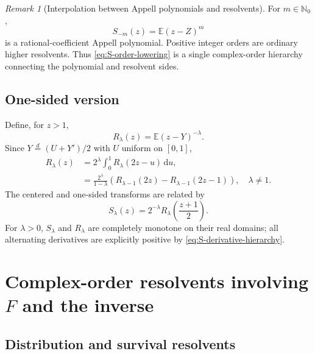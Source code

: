 \documentclass[11pt,oneside]{article}
\numberwithin{equation}{section}
\theoremstyle{plain}
\theoremstyle{definition}
\theoremstyle{remark}
\newtheorem{remark}[theorem]{Remark}
\newcommand{\N}{\mathbb N}
\newcommand{\E}{\mathbb E}
\newcommand{\dd}{\,\mathrm d}
\begin{document}
\begin{remark}[Interpolation between Appell polynomials and resolvents]
For $m\in\N_0$,
\begin{equation}
 S_{-m}(z)=\E(z-Z)^m
 \label{eq:S-negative-polynomial}
\end{equation}
is a rational-coefficient Appell polynomial.  Positive integer orders are
ordinary higher resolvents.  Thus \cref{eq:S-order-lowering} is a single
complex-order hierarchy connecting the polynomial and resolvent sides.
\end{remark}

\subsection{One-sided version}

Define, for $z>1$,
\begin{equation}
 R_\lambda(z)=\E(z-Y)^{-\lambda}.
 \label{eq:R-lambda}
\end{equation}
Since $Y\overset d=(U+Y')/2$ with $U$ uniform on $[0,1]$,
\begin{align}
 R_\lambda(z)
 &=2^\lambda\int_0^1R_\lambda(2z-u)\dd u,
 \label{eq:R-integral-refinement}\\
 &=\frac{2^\lambda}{1-\lambda}
   \left(R_{\lambda-1}(2z)-R_{\lambda-1}(2z-1)\right),
 \quad \lambda\ne1.
 \label{eq:R-order-lowering}
\end{align}
The centered and one-sided transforms are related by
\begin{equation}
 S_\lambda(z)=2^{-\lambda}
 R_\lambda\!\left(\frac{z+1}{2}\right).
 \label{eq:S-R-relation}
\end{equation}
For $\lambda>0$, $S_\lambda$ and $R_\lambda$ are completely monotone on their
real domains; all alternating derivatives are explicitly positive by
\cref{eq:S-derivative-hierarchy}.

\section{Complex-order resolvents involving \texorpdfstring{$F$}{F} and the inverse}
\label{sec:complex-resolvents}

\subsection{Distribution and survival resolvents}
\end{document}
